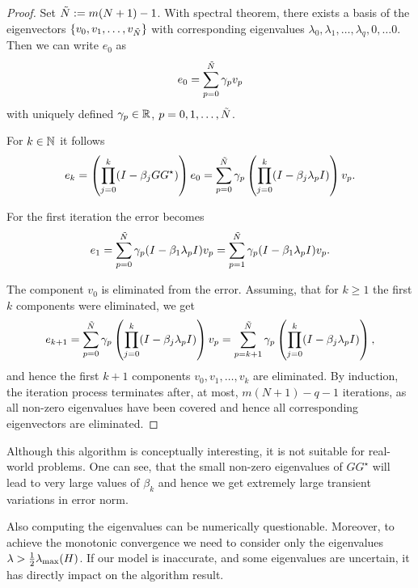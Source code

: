 \begin{proof} 
	Set $\tilde{N} := m(N+1) - 1$. With spectral theorem, there exists a basis of the eigenvectors $\{v_0, v_1, \dots, v_{\tilde{N}}\}$ with corresponding eigenvalues $\lambda_0, \lambda_1, \dots, \lambda_q, 0, \dots 0$. 
	Then we can write $e_0$ as 
	\begin{align}
	e_0 = \sum_{p = 0}^{\tilde{N}} \gamma_p v_p
	\end{align}
	with uniquely defined $\gamma_p \in {\mathbb{R}}$, $p = 0, 1, \dots, \tilde{N}$. 
	
	For $k \in {\mathbb{N}}$ it follows 
	\begin{align}
	e_k = \left(\prod_{j=0}^k(I - \beta_j G G^\star)\right)e_0 = \sum_{p = 0}^{\tilde{N}} \gamma_p \left(\prod_{j=0}^k (I - \beta_j \lambda_p I)\right)v_p.
	\end{align}
	
	For the first iteration the error becomes 
	\begin{align}
	e_1 = \sum_{p = 0}^{\tilde{N}} \gamma_p ( I - \beta_1 \lambda_p I) v_p = \sum_{p=1}^{\tilde{N} } \gamma_p ( I - \beta_1 \lambda_p I) v_p.
	\end{align}
	
	The component $v_0$ is eliminated from the error.
	Assuming, that for $k \geq 1$ the first $k$ components were eliminated, we get 
	\begin{align}
	e_{k+1} = \sum_{p = 0}^{\tilde{N}} \gamma_p \left(\prod_{j=0}^k (I - \beta_j \lambda_p I)\right)v_p = \sum_{p = k + 1}^{\tilde{N}} \gamma_p \left(\prod_{j = 0}^k (I - \beta_j \lambda_p I )\right),
	\end{align}
	and hence the first $k+1$ components $v_0, v_1, \dots, v_k$ are eliminated. 
	By induction, the iteration process terminates after, at most,  $m(N+1) - q - 1$ iterations, as all non-zero eigenvalues have been covered and hence all corresponding eigenvectors are eliminated.	
\end{proof}

Although this algorithm is conceptually interesting, it is not suitable for real-world problems.
One can see, that the small non-zero eigenvalues of $GG^\star$ will lead to very large values of $\beta_k$ and hence we get extremely large transient variations in error norm. 

Also computing the eigenvalues can be numerically questionable. Moreover, to achieve the monotonic convergence we need to consider only the eigenvalues $\lambda > \frac{1}{2}\lambda_{\mathrm{max}}(H)$.
If our model is inaccurate, and some eigenvalues are uncertain, it has directly impact on the algorithm result. 

